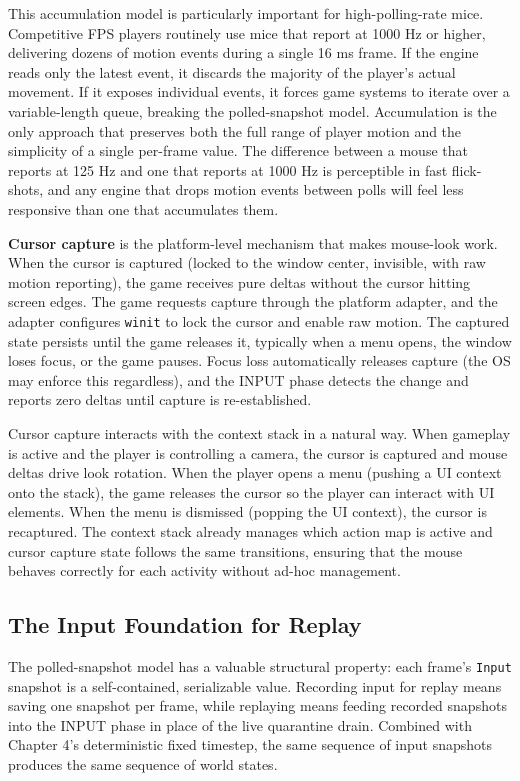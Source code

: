 \documentclass[
  11pt,
  letterpaper,
  DIV=11,
  numbers=noendperiod,
  twoside,
  open=right]{scrreprt}
\begin{document}
This accumulation model is particularly important for high-polling-rate
mice. Competitive FPS players routinely use mice that report at 1000 Hz
or higher, delivering dozens of motion events during a single 16 ms
frame. If the engine reads only the latest event, it discards the
majority of the player's actual movement. If it exposes individual
events, it forces game systems to iterate over a variable-length queue,
breaking the polled-snapshot model. Accumulation is the only approach
that preserves both the full range of player motion and the simplicity
of a single per-frame value. The difference between a mouse that reports
at 125 Hz and one that reports at 1000 Hz is perceptible in fast
flick-shots, and any engine that drops motion events between polls will
feel less responsive than one that accumulates them.

\textbf{Cursor capture} is the platform-level mechanism that makes
mouse-look work. When the cursor is captured (locked to the window
center, invisible, with raw motion reporting), the game receives pure
deltas without the cursor hitting screen edges. The game requests
capture through the platform adapter, and the adapter configures
\texttt{winit} to lock the cursor and enable raw motion. The captured
state persists until the game releases it, typically when a menu opens,
the window loses focus, or the game pauses. Focus loss automatically
releases capture (the OS may enforce this regardless), and the INPUT
phase detects the change and reports zero deltas until capture is
re-established.

Cursor capture interacts with the context stack in a natural way. When
gameplay is active and the player is controlling a camera, the cursor is
captured and mouse deltas drive look rotation. When the player opens a
menu (pushing a UI context onto the stack), the game releases the cursor
so the player can interact with UI elements. When the menu is dismissed
(popping the UI context), the cursor is recaptured. The context stack
already manages which action map is active and cursor capture state
follows the same transitions, ensuring that the mouse behaves correctly
for each activity without ad-hoc management.

\subsection{The Input Foundation for
Replay}\label{the-input-foundation-for-replay}

The polled-snapshot model has a valuable structural property: each
frame's \texttt{Input} snapshot is a self-contained, serializable value.
Recording input for replay means saving one snapshot per frame, while
replaying means feeding recorded snapshots into the INPUT phase in place
of the live quarantine drain. Combined with Chapter 4's deterministic
fixed timestep, the same sequence of input snapshots produces the same
sequence of world states.
\end{document}
